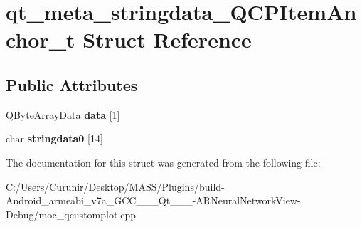 \hypertarget{structqt__meta__stringdata___q_c_p_item_anchor__t}{}\section{qt\+\_\+meta\+\_\+stringdata\+\_\+\+Q\+C\+P\+Item\+Anchor\+\_\+t Struct Reference}
\label{structqt__meta__stringdata___q_c_p_item_anchor__t}
\subsection*{Public Attributes}
\begin{DoxyCompactItemize}
\item 
\mbox{\label{structqt__meta__stringdata___q_c_p_item_anchor__t_aedeb537b1b4f24fb84c8548b0aa57c46}} 
Q\+Byte\+Array\+Data {\bfseries data} \mbox{[}1\mbox{]}
\item 
\mbox{\label{structqt__meta__stringdata___q_c_p_item_anchor__t_a2b7703543f0865748da31333364a67ab}} 
char {\bfseries stringdata0} \mbox{[}14\mbox{]}
\end{DoxyCompactItemize}


The documentation for this struct was generated from the following file\+:\begin{DoxyCompactItemize}
\item 
C\+:/\+Users/\+Curunir/\+Desktop/\+M\+A\+S\+S/\+Plugins/build-\/\+Android\+\_\+armeabi\+\_\+v7a\+\_\+\+G\+C\+C\+\_\+\_\+\_\+\+Qt\+\_\+\_\+\_-\/\+A\+R\+Neural\+Network\+View-\/\+Debug/moc\+\_\+qcustomplot.\+cpp\end{DoxyCompactItemize}
